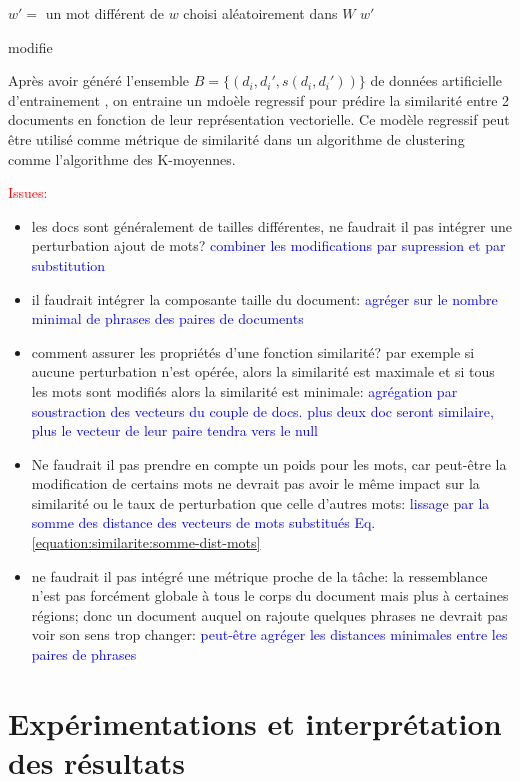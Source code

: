 \begin{algorithm}[H]
 $w' = $ un mot différent de $w$ choisi aléatoirement dans $W$
 \Return $w'$
 \caption{modifie} \label{algo:similarite:modifiemot}
\end{algorithm}

Après avoir généré l'ensemble $B = \lbrace (d_i, d_i', s(d_i, d_i'))\rbrace$ de données artificielle d'entrainement , on entraine un mdoèle regressif pour prédire la similarité entre 2 documents en fonction de leur représentation vectorielle. Ce modèle regressif peut être utilisé comme métrique de similarité dans un algorithme de clustering comme l'algorithme des K-moyennes.

\textcolor{red}{Issues:}
\begin{itemize}
\item les docs sont généralement de tailles différentes, ne faudrait il pas intégrer une perturbation ajout de mots? \textcolor{blue}{combiner les modifications par supression et par substitution}
\item il faudrait intégrer la composante taille du document: \textcolor{blue}{agréger sur le nombre minimal de phrases des paires de documents}
\item comment assurer les propriétés d'une fonction similarité? par exemple si aucune perturbation n'est opérée, alors la similarité est maximale et si tous les mots sont modifiés alors la similarité est minimale: \textcolor{blue}{agrégation par soustraction des vecteurs du couple de docs. plus deux doc seront similaire, plus le vecteur de leur paire tendra vers le null}
\item Ne faudrait il pas prendre en compte un poids pour les mots, car peut-être la modification de certains mots ne devrait pas avoir le même impact sur la similarité ou le taux de perturbation que celle d'autres mots:  \textcolor{blue}{lissage par la somme des distance des vecteurs de mots substitués Eq. \ref{equation:similarite:somme-dist-mots}}
\item ne faudrait il pas intégré une métrique proche de la tâche: la ressemblance n'est pas forcément globale à tous le corps du document mais plus à certaines régions; donc un document auquel on rajoute quelques phrases ne devrait pas voir  son sens trop changer:  \textcolor{blue}{peut-être agréger les distances minimales entre les paires de phrases}
\end{itemize}

\section{Expérimentations et interprétation des résultats}
\label{sec:similarite:experimentations}


